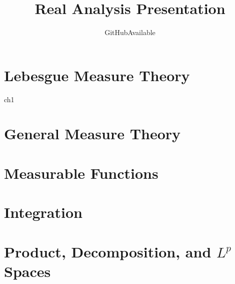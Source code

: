 \documentclass{book}
\title{Real Analysis Presentation}
\author{GitHubAvailable}
\begin{document}

\chapter{Lebesgue Measure Theory}
{ch1}

\chapter{General Measure Theory}

\chapter{Measurable Functions}

\chapter{Integration}

\chapter{Product, Decomposition, and $L^p$ Spaces}
\end{document}
